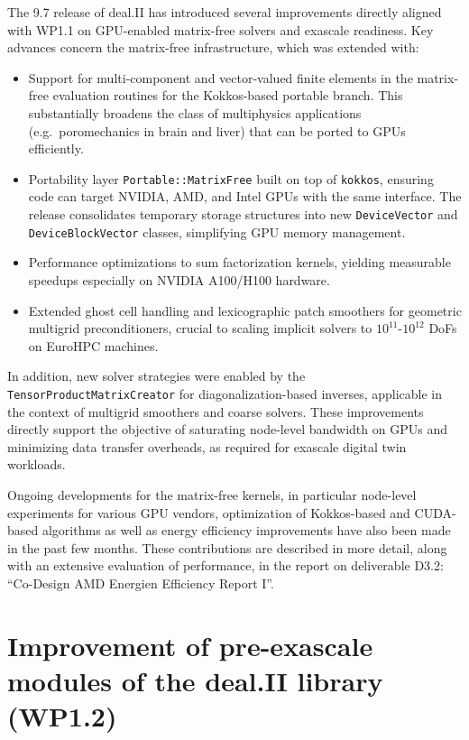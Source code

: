\documentclass[a4paper,12pt]{article}
\begin{document}
The 9.7 release of deal.II has introduced several improvements directly aligned
with WP1.1 on GPU-enabled matrix-free solvers and exascale readiness.  
Key advances concern the matrix-free infrastructure, which was extended with:


\begin{itemize}
  \item Support for multi-component and vector-valued finite elements in the
        matrix-free evaluation routines for the Kokkos-based portable branch. This substantially broadens the class
        of multiphysics applications (e.g.\ poromechanics in brain and liver)
        that can be ported to GPUs efficiently.
  \item Portability layer \texttt{Portable::MatrixFree} built on top of
        \texttt{kokkos}, ensuring code can target NVIDIA, AMD, and Intel GPUs with the
        same interface. The release consolidates temporary storage structures
        into new \texttt{DeviceVector} and \texttt{DeviceBlockVector} classes,
        simplifying GPU memory management.
  \item Performance optimizations to sum factorization kernels, yielding
        measurable speedups especially on NVIDIA A100/H100 hardware.
  \item Extended ghost cell handling and lexicographic patch smoothers for
        geometric multigrid preconditioners, crucial to scaling implicit solvers
        to $10^{11}$-$10^{12}$ DoFs on EuroHPC machines.
\end{itemize}

In addition, new solver strategies were enabled by the\\
\texttt{TensorProductMatrixCreator} for diagonalization-based inverses,
applicable in the context of multigrid smoothers and coarse solvers.
These improvements directly support the objective of saturating node-level
bandwidth on GPUs and minimizing data transfer overheads, as required for
exascale digital twin workloads.

Ongoing developments for the matrix-free kernels, in particular node-level
experiments for various GPU vendors, optimization of Kokkos-based and
CUDA-based algorithms as well as energy efficiency improvements have also been
made in the past few months. These contributions are described in more detail,
along with an extensive evaluation of performance, in the report on
deliverable D3.2: ``Co-Design AMD Energien Efficiency Report I''.


\section{Improvement of pre-exascale modules of the deal.II library (WP1.2)}
\end{document}
